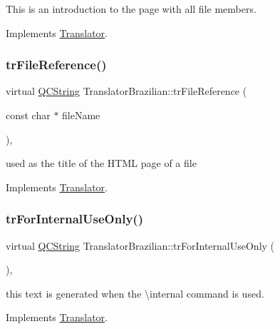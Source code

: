 This is an introduction to the page with all file members. 

Implements \mbox{\hyperlink{class_translator}{Translator}}.

\mbox{\label{class_translator_brazilian_af3b45646d48c6f5fe106d5f6dacbb3f8}} 
\subsubsection{\texorpdfstring{trFileReference()}{trFileReference()}}
{\footnotesize\ttfamily virtual \mbox{\hyperlink{class_q_c_string}{Q\+C\+String}} Translator\+Brazilian\+::tr\+File\+Reference (\begin{DoxyParamCaption}\item[{const char $\ast$}]{file\+Name }\end{DoxyParamCaption})\hspace{0.3cm}{\ttfamily [inline]}, {\ttfamily [virtual]}}

used as the title of the H\+T\+ML page of a file 

Implements \mbox{\hyperlink{class_translator}{Translator}}.

\mbox{\label{class_translator_brazilian_a6303afd1f9a4ce0b8f566fac3673a079}} 
\subsubsection{\texorpdfstring{trForInternalUseOnly()}{trForInternalUseOnly()}}
{\footnotesize\ttfamily virtual \mbox{\hyperlink{class_q_c_string}{Q\+C\+String}} Translator\+Brazilian\+::tr\+For\+Internal\+Use\+Only (\begin{DoxyParamCaption}{ }\end{DoxyParamCaption})\hspace{0.3cm}{\ttfamily [inline]}, {\ttfamily [virtual]}}

this text is generated when the \textbackslash{}internal command is used. 

Implements \mbox{\hyperlink{class_translator}{Translator}}.

